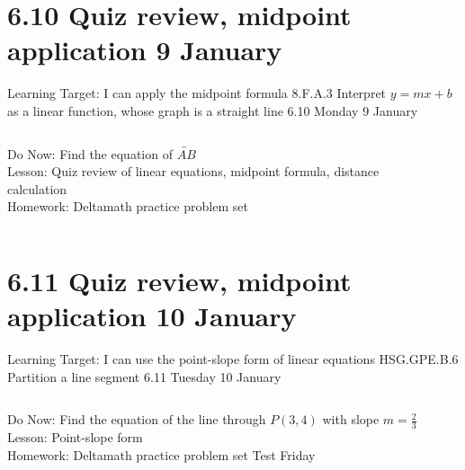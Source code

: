 \section{6.10 Quiz review, midpoint application \hfill 9 January \,}
\begin{frame}{Learning Target: I can apply the midpoint formula}
  {8.F.A.3 Interpret $y=mx+b$ as a linear function, whose graph is a straight line \hfill \alert{6.10 Monday 9 January}}
  \begin{columns}
      Do Now: Find the equation of $\overleftrightarrow{AB}$ \\[1cm]
      Lesson: Quiz review of linear equations, midpoint formula, distance calculation \\
      Homework: Deltamath practice problem set
    \begin{flushright}
    \end{flushright}
  \end{columns}
\end{frame}

\section{6.11 Quiz review, midpoint application \hfill 10 January \,}
\begin{frame}{Learning Target: I can use the point-slope form of linear equations}
  {HSG.GPE.B.6 Partition a line segment \hfill \alert{6.11 Tuesday 10 January}}
  \begin{columns}
      Do Now: Find the equation of the line through $P(3,4)$ with slope $m=\frac{2}{3}$ \\[1cm]
      Lesson: Point-slope form \\
      Homework: Deltamath practice problem set
      Test Friday
    \begin{flushright}
    \end{flushright}
  \end{columns}
\end{frame}

